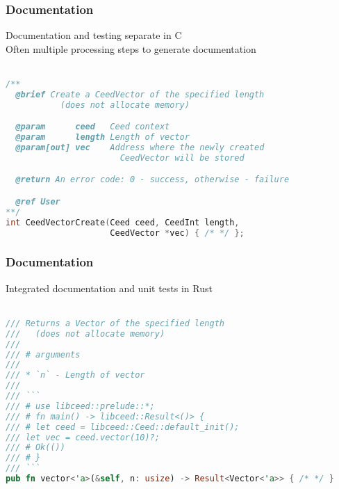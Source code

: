 \documentclass{beamer}
\begin{document}

\begin{frame}[fragile]
\begin{center}
\frametitle{Documentation}

Documentation and testing separate in C\\

Often multiple processing steps to generate documentation\\

~\\

{\footnotesize
\begin{lstlisting}[language=C, style=boxedC]
/**
  @brief Create a CeedVector of the specified length
           (does not allocate memory)

  @param      ceed   Ceed context
  @param      length Length of vector
  @param[out] vec    Address where the newly created
                       CeedVector will be stored

  @return An error code: 0 - success, otherwise - failure

  @ref User
**/
int CeedVectorCreate(Ceed ceed, CeedInt length,
                     CeedVector *vec) { /* */ };
\end{lstlisting}
}

\end{center}
\end{frame}


\begin{frame}[fragile]
\begin{center}
\frametitle{Documentation}

Integrated documentation and unit tests in Rust\\

~\\

{\footnotesize
\begin{lstlisting}[language=Rust, style=boxedRust]
/// Returns a Vector of the specified length
///   (does not allocate memory)
///
/// # arguments
///
/// * `n` - Length of vector
///
/// ```
/// # use libceed::prelude::*;
/// # fn main() -> libceed::Result<()> {
/// # let ceed = libceed::Ceed::default_init();
/// let vec = ceed.vector(10)?;
/// # Ok(())
/// # }
/// ```
pub fn vector<'a>(&self, n: usize) -> Result<Vector<'a>> { /* */ }
\end{lstlisting}
}

\end{center}
\end{frame}
\end{document}
